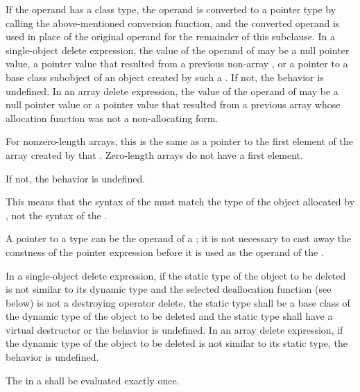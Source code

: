 \pnum
{}%
If the operand has a class type, the operand is converted to a pointer
type by calling the above-mentioned conversion function, and the
converted operand is used in place of the original operand for the
remainder of this subclause.
In a single-object delete expression, the value of the operand of
 may be a null pointer value,
a pointer value
that resulted from a previous non-array , or
a pointer to a base class subobject
of an object created by such a .
If not, the behavior is undefined.
%
In an array delete expression, the value of the operand of 
may be a null pointer value or a pointer value that resulted from
a previous array  whose
allocation function was not a non-allocating form.
\begin{footnote}
For nonzero-length
arrays, this is the same as a pointer to the first
element of the array created by that .
Zero-length arrays do not have a first element.
\end{footnote}
If not, the behavior is undefined.
\begin{note}
This means that the syntax of the  must
match the type of the object allocated by , not the syntax of the
.
\end{note}
\begin{note}
A pointer to a  type can be the operand of a
; it is not necessary to cast away the
constness of the pointer expression before it is
used as the operand of the .
\end{note}

\pnum
{}%
In a single-object delete expression, if the static type of the object to be
deleted is not similar to its dynamic type
and the selected deallocation function (see below)
is not a destroying operator delete,
the static type shall be a base
class of the dynamic type of the object to be deleted and the static type shall
have a virtual destructor or the behavior is undefined. In an array delete
expression, if the dynamic type of the object to be deleted is not similar to
its static type, the behavior is undefined.

\pnum
The  in a  shall
be evaluated exactly once.

